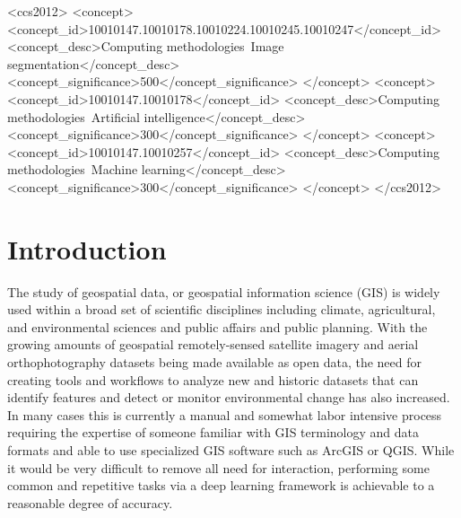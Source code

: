 \documentclass[acmtog, authorversion]{acmart}
\begin{document}

\begin{CCSXML}
<ccs2012>
<concept>
<concept_id>10010147.10010178.10010224.10010245.10010247</concept_id>
<concept_desc>Computing methodologies~Image segmentation</concept_desc>
<concept_significance>500</concept_significance>
</concept>
<concept>
<concept_id>10010147.10010178</concept_id>
<concept_desc>Computing methodologies~Artificial intelligence</concept_desc>
<concept_significance>300</concept_significance>
</concept>
<concept>
<concept_id>10010147.10010257</concept_id>
<concept_desc>Computing methodologies~Machine learning</concept_desc>
<concept_significance>300</concept_significance>
</concept>
</ccs2012>
\end{CCSXML}




\maketitle

\section{Introduction}

The study of geospatial data, or geospatial information science (GIS) is widely used within a broad set of scientific disciplines including climate, agricultural, and environmental sciences and public affairs and public planning. With the growing amounts of geospatial remotely-sensed satellite imagery and aerial orthophotography datasets being made available as open data, the need for creating tools and workflows to analyze new and historic datasets that can identify features and detect or monitor environmental change has also increased. In many cases this is currently a manual and somewhat labor intensive process requiring the expertise of someone familiar with GIS terminology and data formats and able to use specialized GIS software such as ArcGIS or QGIS. While it would be very difficult to remove all need for interaction, performing some common and repetitive tasks via a deep learning framework is achievable to a reasonable degree of accuracy.
\end{document}
